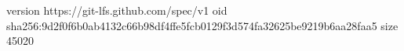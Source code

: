 version https://git-lfs.github.com/spec/v1
oid sha256:9d2f0f6b0ab4132c66b98df4ffe5fcb0129f3d574fa32625be9219b6aa28faa5
size 45020

